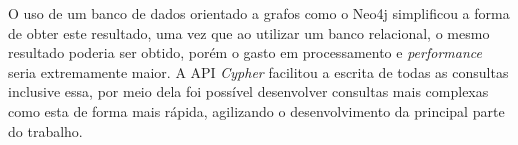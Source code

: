 \par O uso de um banco de dados orientado a grafos como o Neo4j simplificou a forma de obter este resultado, uma vez que ao utilizar um banco relacional, o mesmo resultado poderia ser obtido, porém o gasto em processamento  e \textit{performance} seria extremamente maior. A API \textit{Cypher} facilitou a escrita de todas as consultas inclusive essa, por meio dela foi possível desenvolver consultas mais complexas como esta de forma mais rápida, agilizando o desenvolvimento da principal parte do trabalho.



